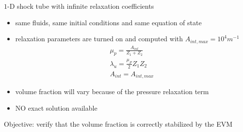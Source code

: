 \documentclass[xcolor=dvipsnames,10pt]{beamer}
\begin{document}
\begin{frame}{$1$-D shock tube with infinite relaxation coefficients}
\begin{block}{}
\begin{itemize}
\setlength{\itemsep}{5pt}
\item same fluids, same initial conditions and same equation of state
\item relaxation parameters are turned on and computed with $A_{int,max} = 10^4 m^{-1}$
\begin{align}
\mu_p = \frac{A_{int}}{Z_1+Z_2} \nonumber \\
\lambda_u = \frac{\mu_P}{2} Z_1 Z_2 \nonumber \\
A_{int} = A_{int,max} \nonumber
\end{align}
\item volume fraction will vary because of the pressure relaxation term
\item NO exact solution available
\end{itemize}
\end{block}
Objective: verify that the volume fraction is correctly stabilized by the EVM
\end{frame}
\end{document}
